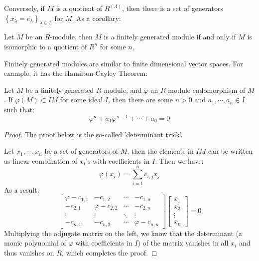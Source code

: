 \documentclass{note-eng}
\begin{document}
Conversely, if $M$ is a quotient of $R^{(\Lambda)}$, then there is a set of generators $\left\lbrace x_\lambda = \overline{e_\lambda} \right\rbrace_{\lambda \in \Lambda}$ for $M$. As a corollary:

\begin{corollary}
    Let $M$ be an $R$-module, then $M$ is a finitely generated module if and only if $M$ is isomorphic to a quotient of $R^n$ for some $n$.
\end{corollary}

Finitely generated modules are similar to finite dimensional vector spaces. For example, it has the Hamilton-Cayley Theorem:

\begin{theorem}
    Let $M$ be a finitely generated $R$-module, and $\varphi$ an $R$-module endomorphism of $M$. If $\varphi(M) \subset IM$ for some ideal $I$, then there are some $n \gt 0$ and $a_1, \cdots, a_n \in I$ such that:
    $$\varphi^n + a_1 \varphi^{n - 1} + \cdots + a_0 = 0$$
\end{theorem}

\begin{proof}
    The proof below is the so-called 'determinant trick'.

    Let $x_1, \cdots, x_n$ be a set of generators of $M$, then the elements in $IM$ can be written as linear combination of $x_i$'s with coefficients in $I$. Then we have:
    $$\varphi(x_i) = \sum\limits_{i = 1}^{n}c_{i, j} x_j$$
    As a result:
    $$
    \begin{bmatrix}
        \varphi - c_{1, 1} & -c_{1, 2} & \cdots &-c_{1, n} \\
        - c_{2, 1} & \varphi - c_{2, 2} & \cdots &-c_{2, n} \\
        \vdots &\vdots &\ddots &\vdots \\
        - c_{n, 1} & -c_{n, 2} & \cdots & \varphi - c_{n, n}
    \end{bmatrix}
    \begin{bmatrix}
        x_1 \\ x_2 \\ \vdots \\ x_n
    \end{bmatrix} = 0
    $$
    Multiplying the adjugate matrix on the left, we know that the determinant (a monic polynomial of $\varphi$ with coefficients in $I$) of the matrix vanishes in all $x_i$ and thus vanishes on $R$, which completes the proof.
\end{proof}
\end{document}
